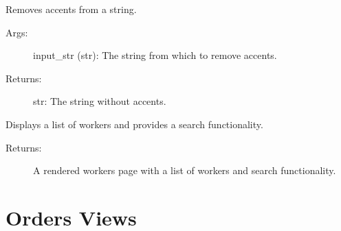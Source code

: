 \documentclass[letterpaper,10pt,english]{sphinxmanual}
\begin{document}

\begin{fulllineitems}
\label{\detokenize{modules/views:Dashboard.views.remove_accents}}
\sphinxAtStartPar
Removes accents from a string.
\begin{description}
\item[{Args:}] \leavevmode
\sphinxAtStartPar
input\_str (str): The string from which to remove accents.

\item[{Returns:}] \leavevmode
\sphinxAtStartPar
str: The string without accents.

\end{description}

\end{fulllineitems}


\begin{fulllineitems}
\label{\detokenize{modules/views:Dashboard.views.workers}}
\sphinxAtStartPar
Displays a list of workers and provides a search functionality.
\begin{description}
\item[{Returns:}] \leavevmode
\sphinxAtStartPar
A rendered workers page with a list of workers and search functionality.

\end{description}

\end{fulllineitems}



\chapter{Orders Views}
\label{\detokenize{modules/views:module-OutputHistory.views}}\label{\detokenize{modules/views:orders-views}}
\end{document}
